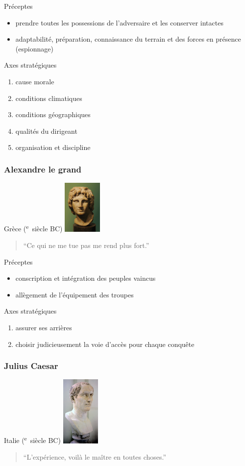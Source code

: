\documentclass{article}
\newcommand{\cRM}[1]{\MakeUppercase{\romannumeral #1}}  %
\newcommand{\siecle}[1]{\cRM{#1}\textsuperscript{e}~siècle}
\begin{document}
Préceptes
\begin{itemize}
\item prendre toutes les possessions de l'adversaire et les conserver intactes
\item adaptabilité, préparation, connaissance du terrain et des forces en présence (espionnage)
\end{itemize}
Axes stratégiques
\begin{enumerate}
\item cause morale
\item conditions climatiques
\item conditions géographiques
\item qualités du dirigeant
\item organisation et discipline
\end{enumerate}

\cite{tzu1997art, sun_tzu_fighting, sun_tzu_wiki}

\subsubsection{Alexandre le grand}
Grèce (\siecle{4} BC)
\includegraphics[trim=0cm 8cm 0cm 0cm, clip=true, width=1.9cm]{../ressources/AlexanderTheGreat_Bust}
\begin{quote}“Ce qui ne me tue pas me rend plus fort.”\end{quote}

Préceptes
\begin{itemize}
\item conscription et intégration des peuples vaincus
\item allègement de l'équipement des troupes
\end{itemize}
Axes stratégiques
\begin{enumerate}
\item assurer ses arrières
\item choisir judicieusement la voie d'accès pour chaque conquête
\end{enumerate}
\cite{alexander_the_great, alexandre_balkans}

\subsubsection{Julius Caesar}
Italie (\siecle{1} BC)
\includegraphics[trim=0cm 20cm 0cm 0cm, clip=true, width=1.9cm]{../ressources/cesare}
\begin{quote}“L’expérience, voilà le maître en toutes choses.”\end{quote}
\end{document}
